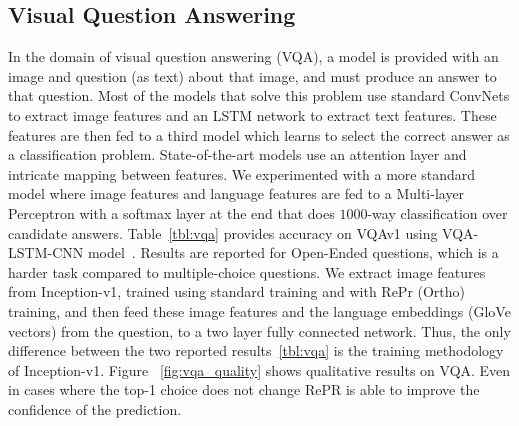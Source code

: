 \subsection{Visual Question Answering}

In the domain of visual question answering (VQA), a model is provided with an image and question (as text) about that image, and must produce an answer to that question.
Most of the models that solve this problem use standard ConvNets to extract image features and an LSTM network to extract text features.
These features are then fed to a third model which learns to select the correct answer as a classification problem. State-of-the-art models use an attention layer and intricate mapping between features. We experimented with a more standard model where image features and language features are fed to a Multi-layer Perceptron with a softmax layer at the end that does $1000$-way classification over candidate answers.
Table~\ref{tbl:vqa} provides accuracy on VQAv1 using VQA-LSTM-CNN model~\cite{Antol2015VQAVQ}.
Results are reported for Open-Ended questions, which is a harder task compared to multiple-choice questions.
We extract image features from Inception-v1, trained using standard training and with RePr (Ortho) training, and then feed these image features and the language embeddings (GloVe vectors) from the question, to a two layer fully connected network. 
Thus, the only difference between the two reported results~\ref{tbl:vqa} is the training methodology of Inception-v1.
Figure ~\ref{fig:vqa_quality} shows qualitative results on VQA. Even in cases where the top-1 choice does not change RePR is able to improve the confidence of the prediction.



